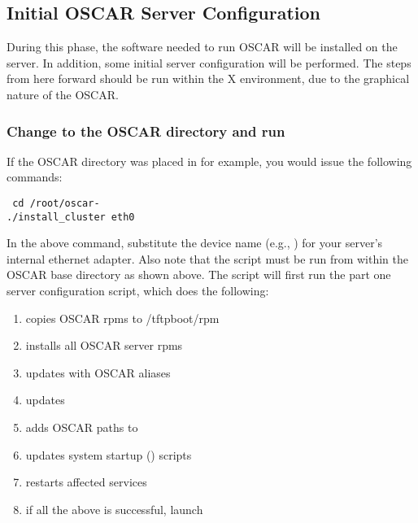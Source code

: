 \endchange

  
\subsection{Initial OSCAR Server Configuration}

During this phase, the software needed to run OSCAR will be installed
on the server. In addition, some initial server configuration will be
performed. The steps from here forward should be run within the X
environment, due to the graphical nature of the OSCAR.

\subsubsection{Change to the OSCAR directory and run }
\label{det:installcluster}

\begchange
If the OSCAR directory was placed in  for example, you
would issue the following commands:

\vspace{11pt}
{\tt
  cd /root/oscar-\oscarversion \\
\indent  ./install\_cluster eth0
}
\vspace{11pt}
\endchange
  
\begchange
In the above command, substitute the device name 
\endchange
(e.g., )
for your server's internal ethernet adapter. Also note that the
 script must be run from within the OSCAR base
directory as shown above. The script will first run the part one
server configuration script, which does the following:

\begin{enumerate}
\item copies OSCAR rpms to /tftpboot/rpm
\item installs all OSCAR server rpms
\item updates  with OSCAR aliases
\item updates  
\item adds OSCAR paths to  
\item updates system startup () scripts
\item restarts affected services
\item if all the above is successful, launch 
\end{enumerate}
  

